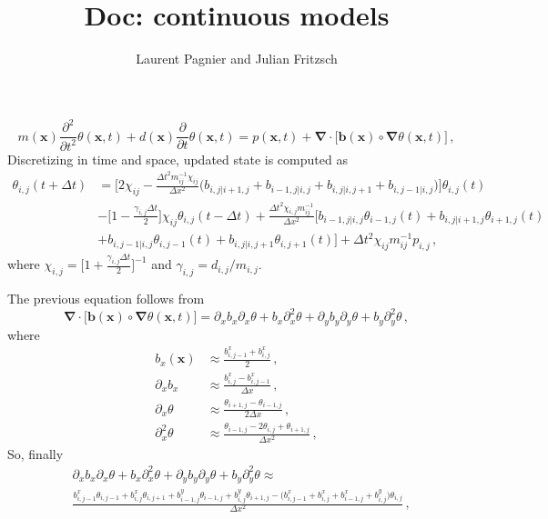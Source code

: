 \documentclass[notitlepage]{revtex4-2}
\begin{document}
\title{Doc: continuous models}
\author{Laurent Pagnier and Julian Fritzsch}
\maketitle


\begin{equation}
m(\bm x)\frac{\partial^2}{\partial t^2}\theta(\bm x,t)+d(\bm x)\frac{\partial}{\partial t}\theta(\bm x,t)=p(\bm x,t)+\bm\nabla\cdot\big[\bm b(\bm x)\circ\bm\nabla\theta(\bm x,t)\big]\,,
\end{equation}
Discretizing in time and space, updated state is computed as 
\begin{align}
\theta_{i,j}(t+\Delta t) &= 
\bigg[2\chi_{ij} -\frac{\Delta t^2 m_{ij}^{-1}\chi_{ij}}{\Delta x^2}\Big(b_{i,j|i+1,j}+b_{i-1,j|i,j}+b_{i,j|i,j+1}+b_{i,j-1|i,j}\Big)\bigg]\theta_{i,j}(t)\nonumber\\
&-\Big[1-\frac{\gamma_{i,j}\Delta t}{2}\Big]\chi_{ij}\theta_{i,j}(t-\Delta t) +\frac{\Delta t^2 \chi_{i,j}m_{ij}^{-1}}{\Delta x^2}\bigg[b_{i-1,j|i,j}\theta_{i-1,j}(t)+b_{i,j|i+1,j}\theta_{i+1,j}(t)\nonumber\\
&+b_{i,j-1|i,j}\theta_{i,j-1}(t)
+b_{i,j|i,j+1}\theta_{i,j+1}(t)\bigg] + \Delta t^2 \chi_{ij} m_{ij}^{-1}p_{i,j}\,,
\end{align}
where $\chi_{i,j}=\Big[1+\frac{\gamma_{i,j}\Delta t}{2}\Big]^{-1}$ and $\gamma_{i,j}=d_{i,j}/m_{i,j}$.

The previous equation follows from
\begin{equation}
\bm\nabla\cdot\big[\bm b(\bm x)\circ\bm\nabla\theta(\bm x,t)\big]=\partial_xb_x\partial_x\theta+b_x\partial_x^2\theta +\partial_yb_y\partial_y\theta+b_y\partial_y^2\theta\,,
\end{equation}
where
\begin{align}
b_x(\bm x)&\approx\frac{b^x_{i,j-1}+b^x_{i,j}}{2}\,,\\
\partial_xb_x&\approx\frac{b^x_{i,j}-b^x_{i,j-1}}{\Delta x}\,,\\
\partial_x\theta&\approx\frac{\theta_{i+1,j}-\theta_{i-1,j}}{2\Delta x}\,,\\
\partial_x^2\theta&\approx\frac{\theta_{i-1,j}-2\theta_{i,j}+\theta_{i+1,j}}{\Delta x^2}\,,
\end{align}
So, finally
\begin{align}
&\partial_xb_x\partial_x\theta+b_x\partial_x^2\theta +\partial_yb_y\partial_y\theta+b_y\partial_y^2\theta\approx\\
&\frac{b^x_{i,j-1}\theta_{i,j-1}+b^x_{i,j}\theta_{i,j+1}+b^y_{i-1,j}\theta_{i-1,j}+b^y_{i,j}\theta_{i+1,j}-\big(b^x_{i,j-1}+b^x_{i,j}+ b^x_{i-1,j}+b^y_{i,j}\big)\theta_{i,j}}{\Delta x^2}\,,
\end{align}
\end{document}
